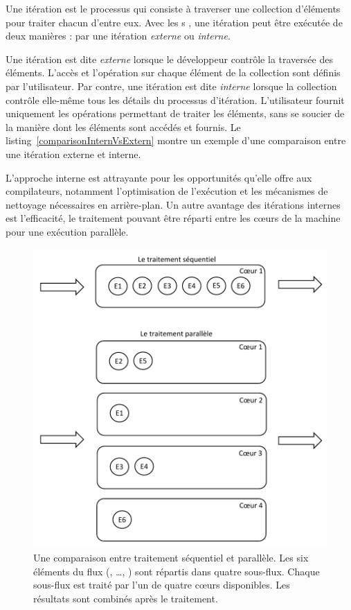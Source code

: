 Une it\'eration est le processus qui consiste \`a traverser une collection d'\'el\'ements pour traiter chacun d'entre eux. Avec les s , une it\'eration peut \^etre ex\'ecut\'ee de deux mani\`eres : par une it\'eration \emph{externe} ou \emph{interne}. 

Une it\'eration est dite \emph{externe} lorsque le d\'eveloppeur contr\^ole la travers\'ee des \'el\'ements.  L'acc\`es et l'op\'eration sur chaque \'el\'ement de la collection sont d\'efinis par l'utilisateur. Par contre, une it\'eration est dite \emph{interne} lorsque la collection contr\^ole elle-m\^eme tous les d\'etails du processus d'it\'eration. L'utilisateur fournit uniquement les op\'erations permettant de traiter les \'el\'ements, sans se soucier de la mani\`ere dont les \'el\'ements sont acc\'ed\'es et fournis. Le listing~\ref{comparisonInternVsExtern} montre un exemple d’une comparaison entre une itération externe et interne. 

L'approche interne est attrayante pour les opportunit\'es qu'elle offre aux compilateurs, notamment l'optimisation de l'exécution et les m\'ecanismes de nettoyage n\'ecessaires en arri\`ere-plan. Un autre avantage des it\'erations internes est l'efficacit\'e, le traitement pouvant \^etre r\'eparti entre les cœurs de la machine pour une ex\'ecution parall\`ele.


\begin{figure}
\centering
     \includegraphics[width=1.0\textwidth]{Figures/ComparisonSequentialVsParallel.pdf}
      \caption[Une comparaison entre traitement s\'equentiel et parall\`ele.]{Une comparaison entre traitement s\'equentiel et parall\`ele. Les six \'el\'ements du flux (, \ldots,  ) sont r\'epartis dans quatre sous-flux. Chaque sous-flux est trait\'e par l'un de quatre cœurs disponibles. Les r\'esultats sont combin\'es apr\`es le traitement.}
       \label{ComparisonSequentialVsParallel.fig}
\end{figure}


